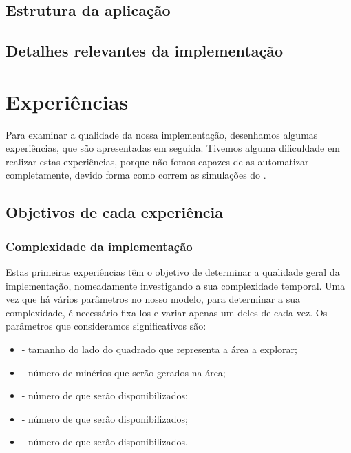 \documentclass[12pt]{report}
\begin{document}
\section{Estrutura da aplicação}


\section{Detalhes relevantes da implementação}


\chapter{Experiências}

Para examinar a qualidade da nossa implementação, desenhamos algumas experiências, que são apresentadas em seguida. Tivemos alguma dificuldade em realizar estas experiências, porque não fomos capazes de as automatizar completamente, devido forma como correm as simulações do \repast.

\section{Objetivos de cada experiência}

\subsection{Complexidade da implementação}

Estas primeiras experiências têm o objetivo de determinar a qualidade geral da implementação, nomeadamente investigando a sua complexidade temporal. Uma vez que há vários parâmetros no nosso modelo, para determinar a sua complexidade, é necessário fixa-los e variar apenas um deles de cada vez. Os parâmetros que consideramos significativos são:
\begin{itemize}
	\item \size - tamanho do lado do quadrado que representa a área a explorar;
	\item \minerals - número de minérios que serão gerados na área;
	\item \spotters - número de \spotters que serão disponibilizados;
	\item \producers - número de \producers que serão disponibilizados;
	\item \transporters - número de \transporters que serão disponibilizados.
\end{itemize}
\end{document}
